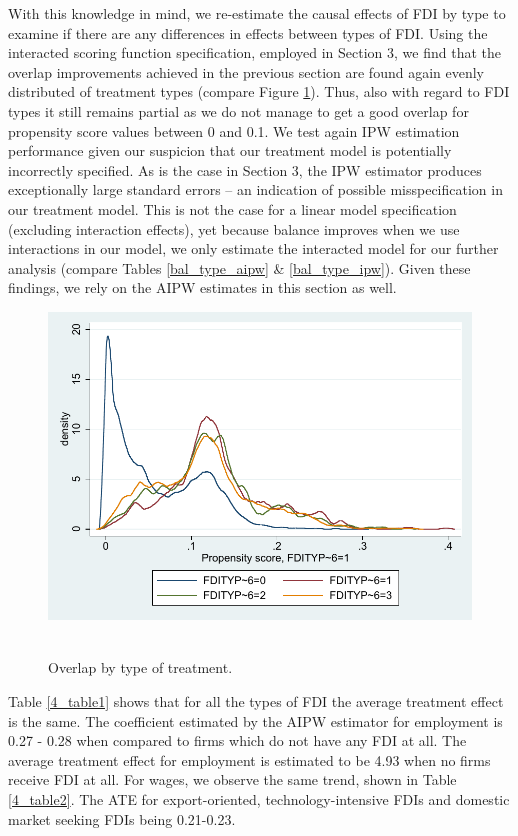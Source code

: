 With this knowledge in mind, we re-estimate the causal effects of FDI by type to examine if there are any differences in effects between types of FDI. Using the interacted scoring function specification, employed in Section 3, we find that the overlap improvements achieved in the previous section are found again evenly distributed of treatment types (compare Figure \ref{ol_aipw_type}). Thus, also with regard to FDI types it still remains partial as we do not manage to get a good overlap for propensity score values between 0 and 0.1. We test again IPW estimation performance given our suspicion that our treatment model is potentially incorrectly specified. As is the case in Section 3, the IPW estimator produces exceptionally large standard errors – an indication of possible misspecification in our treatment model. This is not the case for a linear model specification (excluding interaction effects), yet because balance improves when we use interactions in our model, we only estimate the interacted model for our further analysis (compare Tables \ref{bal_type_aipw} \& \ref{bal_type_ipw}). Given these findings, we rely on the AIPW estimates in this section as well.  

\begin{figure}
	\centering
	\includegraphics[scale=0.6]{figures_and_tables/4_overlap_aipw_typeFDI.pdf}\
	\caption{Overlap by type of treatment.}
	\label{ol_aipw_type}
\end{figure}





Table \ref{4_table1} shows that for all the types of FDI the average treatment effect is the same. The coefficient estimated by the AIPW estimator for employment is 0.27 - 0.28 when compared to firms which do not have any FDI at all. The average treatment effect for employment is estimated to be 4.93 when no firms receive FDI at all. For wages, we observe the same trend, shown in Table \ref{4_table2}. The ATE for export-oriented, technology-intensive FDIs and domestic market seeking FDIs being 0.21-0.23. 
